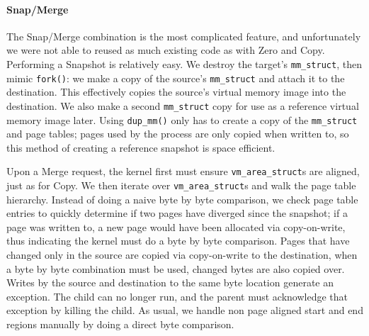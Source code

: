 \begin{itemize}

\paragraph{Snap/Merge}
The Snap/Merge combination is the most complicated feature, and unfortunately we
were not able to reused as much existing code as with Zero and Copy. Performing
a Snapshot is relatively easy. We destroy the target's {\tt mm\_struct}, then
mimic {\tt fork()}: we make a copy of the source's {\tt mm\_struct} and attach
it to the destination. This effectively copies the source's virtual memory image
into the destination. We also make a second {\tt mm\_struct} copy for use as a
reference virtual memory image later. Using {\tt dup\_mm()} only has to create
a copy of the {\tt mm\_struct} and page tables; pages used by the process are
only copied when written to, so this method of creating a reference snapshot is
space efficient.

Upon a Merge request, the kernel first must ensure {\tt vm\_area\_struct}s are
aligned, just as for Copy. We then iterate over {\tt vm\_area\_struct}s and walk
the page table hierarchy. Instead of doing a naive byte by byte comparison, we
check page table entries to quickly determine if
two pages have diverged since the snapshot; if a page was written to, a new page
would have been allocated via copy-on-write, thus indicating the kernel must do
a byte by byte comparison. Pages that have changed only in the source are copied
via copy-on-write to the destination, when a byte by byte combination must be
used, changed bytes are also copied over. Writes by the source and destination
to the same byte location generate an exception. The child can no longer run,
and the parent must acknowledge that exception by killing the child. As usual,
we handle non page aligned start and end regions manually by doing a direct
byte comparison.


\end{itemize}
